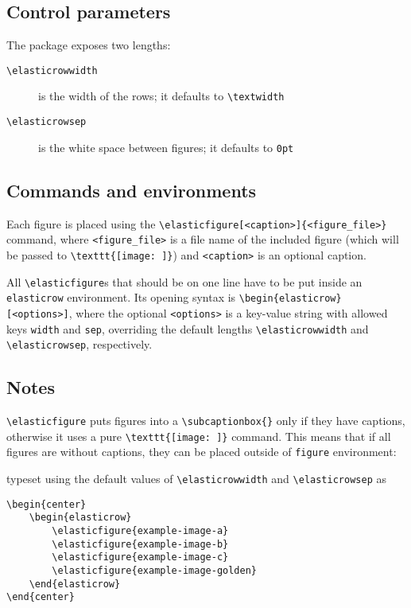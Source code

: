 \documentclass[a4paper]{scrartcl}
\begin{document}
\subsection{Control parameters}

The package exposes two lengths:
\begin{description}
	\item[\texttt{\textbackslash{}elasticrowwidth}] is the width of the rows; it defaults to \verb*|\textwidth|
	\item[\texttt{\textbackslash{}elasticrowsep}] is the white space between figures; it defaults to \verb*|0pt|
\end{description}

\subsection{Commands and environments}

Each figure is placed using the \verb*|\elasticfigure[<caption>]{<figure_file>}| command, where \verb*|<figure_file>| is a file name of the included figure (which will be passed to \verb*|\texttt{[image: ]}|) and \verb*|<caption>| is an optional caption.

All \verb*|\elasticfigure|s that should be on one line have to be put inside an \verb*|elasticrow| environment.
Its opening syntax is \verb*|\begin{elasticrow}[<options>]|, where the optional \verb*|<options>| is a key-value string with allowed keys \verb*|width| and \verb*|sep|, overriding the default lengths \verb*|\elasticrowwidth| and \verb*|\elasticrowsep|, respectively.

\subsection{Notes}

\verb*|\elasticfigure| puts figures into a \verb*|\subcaptionbox{}| only if they have captions, otherwise it uses a pure \verb*|\texttt{[image: ]}| command.
This means that if all figures are without captions, they can be placed outside of \verb*|figure| environment:

\begin{center}
	\begin{elasticrow}
	\end{elasticrow}
\end{center}
typeset using the default values of \verb*|\elasticrowwidth| and \verb*|\elasticrowsep| as
\begin{verbatim}
\begin{center}
    \begin{elasticrow}
        \elasticfigure{example-image-a}
        \elasticfigure{example-image-b}
        \elasticfigure{example-image-c}
        \elasticfigure{example-image-golden}
    \end{elasticrow}
\end{center}
\end{verbatim}
\end{document}
